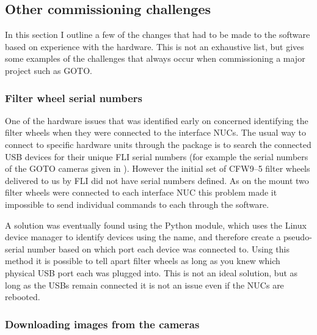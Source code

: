 \begin{colsection}
\begin{colsection}
\end{colsection}


\newpage
\subsection{Other commissioning challenges}
\label{sec:challenges}
\begin{colsection}

In this section I outline a few of the changes that had to be made to the software based on experience with the hardware. This is not an exhaustive list, but gives some examples of the challenges that always occur when commissioning a major project such as GOTO.\@

\subsubsection{Filter wheel serial numbers}

One of the hardware issues that was identified early on concerned identifying the filter wheels when they were connected to the interface NUCs. The usual way to connect to specific hardware units through the  package is to search the connected USB devices for their unique FLI serial numbers (for example the serial numbers of the GOTO cameras given in ). However the initial set of CFW9--5 filter wheels delivered to us by FLI did not have serial numbers defined. As on the mount two filter wheels were connected to each interface NUC this problem made it impossible to send individual commands to each through the software.

A solution was eventually found using the Python  module, which uses the Linux  device manager to identify devices using the  name, and therefore create a pseudo-serial number based on which port each device was connected to. Using this method it is possible to tell apart filter wheels as long as you knew which physical USB port each was plugged into. This is not an ideal solution, but as long as the USBs remain connected it is not an issue even if the NUCs are rebooted.

\subsubsection{Downloading images from the cameras}


\end{colsection}
\end{colsection}
